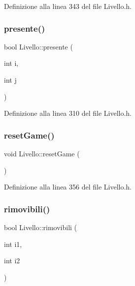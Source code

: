 Definizione alla linea 343 del file Livello.\+h.

\mbox{\label{class_livello_afe5db8bd89c50b5a61f5dd2c91752e74}} 
\subsubsection{\texorpdfstring{presente()}{presente()}}
{\footnotesize\ttfamily bool Livello\+::presente (\begin{DoxyParamCaption}\item[{int}]{i,  }\item[{int}]{j }\end{DoxyParamCaption})\hspace{0.3cm}{\ttfamily [inline]}}



Definizione alla linea 310 del file Livello.\+h.

\mbox{\label{class_livello_a764dfd1eafd8e239aded749833068b21}} 
\subsubsection{\texorpdfstring{reset\+Game()}{resetGame()}}
{\footnotesize\ttfamily void Livello\+::reset\+Game (\begin{DoxyParamCaption}{ }\end{DoxyParamCaption})\hspace{0.3cm}{\ttfamily [inline]}}



Definizione alla linea 356 del file Livello.\+h.

\mbox{\label{class_livello_a8e2cce4a55babb0d896e9e959363f6b0}} 
\subsubsection{\texorpdfstring{rimovibili()}{rimovibili()}}
{\footnotesize\ttfamily bool Livello\+::rimovibili (\begin{DoxyParamCaption}\item[{int}]{i1,  }\item[{int}]{i2 }\end{DoxyParamCaption})\hspace{0.3cm}{\ttfamily [inline]}}



